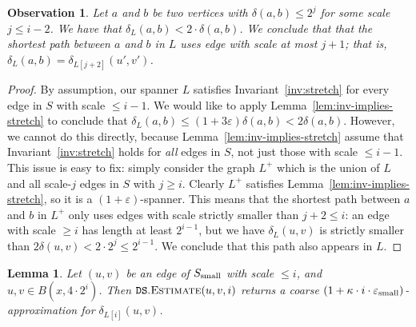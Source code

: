 \documentclass[11pt]{article}
\let\e\varepsilon               %
\newtheorem{lemma}[theorem]{Lemma}
\newtheorem{observation}[theorem]{Observation}
\newcommand{\dist}{\ensuremath{\delta}}
\newcommand{\DS}{\texttt{DS}}
\begin{document}
%
\begin{observation}
\label{obs:small-L}
    Let $a$ and $b$ be two vertices with $\dist(a,b) \le 2^j$ for some scale $j \le i - 2$. 
    We have that $\dist_L(a,b) < 2 \cdot \dist(a,b)$. We conclude that that the shortest path between $a$ and $b$ in $L$ uses edge with scale at most $j+1$; that is, $\dist_{L}(a,b) = \dist_{L[j+2]}(u',v')$.
\end{observation}
\begin{proof}
    By assumption, our spanner $L$ satisfies Invariant~\ref{inv:stretch} for every edge in $S$ with scale $\le i - 1$. We would like to apply Lemma~\ref{lem:inv-implies-stretch} to conclude that $\dist_L(a,b) \le (1+3\e) \dist(a,b) < 2 \dist(a,b)$. However, we cannot do this directly, because Lemma~\ref{lem:inv-implies-stretch} assume that Invariant~\ref{inv:stretch} holds for \emph{all} edges in $S$, not just those with scale $\le i -1$. This issue is easy to fix: simply consider the graph $L^+$ which is the union of $L$ and all scale-$j$ edges in $S$ with $j \ge i$. Clearly $L^+$ satisfies Lemma~\ref{lem:inv-implies-stretch}, so it is a $(1+\e)$-spanner. This means that the shortest path between $a$ and $b$ in $L^+$ only uses edges with scale strictly smaller than $j + 2 \le i$: an edge with scale $\ge i$ has length at least $2^{i-1}$, but we have $\dist_L(u,v)$ is strictly smaller than $2 \dist(u,v) < 2 \cdot 2^{j} \le 2^{i-1}$. We conclude that this path also appears in $L$.
\end{proof}
%
%
\begin{lemma}
\label{lem:estimate-correct}
Let $(u,v)$ be an edge of $S_{\rm small}$ with scale $\le i$, and $u,v \in B(x, 4 \cdot 2^i)$. Then $\DS.\textsc{Estimate}(u,v,i)$ returns a coarse $(1 + \kappa \cdot i \cdot \e_{\rm small})$-approximation for $\dist_{L[i]}(u,v)$.
\end{lemma}
\end{document}
